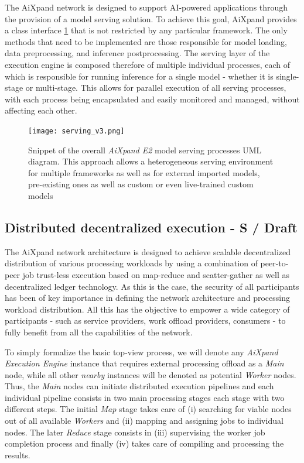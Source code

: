 \documentclass{article}
\begin{document}

The AiXpand network is designed to support AI-powered applications through the provision of a model serving solution. To achieve this goal, AiXpand provides a class interface \figurename{\ref{fig:sc_uml}} that is not restricted by any particular framework. The only methods that need to be implemented are those responsible for model loading, data preprocessing, and inference postprocessing. The serving layer of the execution engine is composed therefore of multiple individual processes, each of which is responsible for running inference for a single model - whether it is single-stage or multi-stage. This allows for parallel execution of all serving processes, with each process being encapsulated and easily monitored and managed, without affecting each other.

\begin{figure}[h]
    \centering
    \texttt{[image: serving\_v3.png]}
    \caption{Snippet of the overall \textit{AiXpand E2} model serving processes UML diagram. This approach allows a heterogeneous serving environment for multiple frameworks as well as for external imported models, pre-existing ones as well as custom or even live-trained custom models}
    \label{fig:sc_uml}
\end{figure}

\subsection{Distributed decentralized execution - S / Draft}
The AiXpand network architecture is designed to achieve scalable decentralized distribution of various processing workloads by using a combination of peer-to-peer job trust-less execution based on map-reduce \cite{map_reduce} and scatter-gather \cite{scatter_gather} as well as decentralized ledger technology. As this is the case, the security of all participants has been of key importance in defining the network architecture and processing workload distribution. All this has the objective to empower a wide category of participants - such as service providers, work offload providers, consumers - to fully benefit from all the capabilities of the network.

To simply formalize the basic top-view process, we will denote any \textit{AiXpand Execution Engine} instance that requires external processing offload as a \textit{Main} node, while all other \textit{nearby} instances will be denoted as potential \textit{Worker} nodes. Thus, the \textit{Main} nodes can initiate distributed execution pipelines and each individual pipeline consists in two main processing stages each stage with two different steps. The initial \textit{Map} stage takes care of (i) searching for viable nodes out of all available \textit{Workers} and (ii) mapping and assigning jobs to individual nodes. The later \textit{Reduce} stage consists in (iii) supervising the worker job completion process and finally (iv) takes care of compiling and processing the results. 
\end{document}
